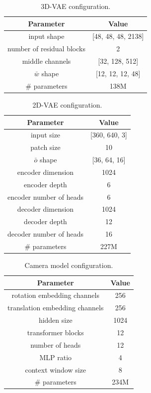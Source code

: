 \documentclass{article}
\theoremstyle{plain}
\theoremstyle{definition}
\theoremstyle{remark}
\begin{document}
\begin{table}[htb!]
\centering
\caption{3D-VAE configuration.}
\begin{tabular}{cc}\toprule  
Parameter & Value \\
\midrule
input shape & [48, 48, 48, 2138] \\
number of residual blocks & 2 \\
middle channels & [32, 128, 512] \\
$\bar{w}$ shape & [12, 12, 12, 48] \\
\# parameters & 138M \\
\bottomrule
\end{tabular}
\label{table:w-vae}
\end{table}

\begin{table}[htb!]
\centering
\caption{2D-VAE configuration.}
\begin{tabular}{cc}\toprule  
Parameter & Value \\
\midrule
input size & [360, 640, 3] \\
patch size & 10 \\
$\bar{o}$ shape & [36, 64, 16] \\
encoder dimension & 1024 \\
encoder depth & 6 \\
encoder number of heads & 6 \\
decoder dimension & 1024 \\
decoder depth & 12 \\
decoder number of heads & 16 \\
\# parameters & 227M \\
\bottomrule
\end{tabular}
\label{table:p-vae}
\end{table}

\begin{table}[htb!]
\centering
\caption{Camera model configuration.}
\begin{tabular}{cc}\toprule  
Parameter & Value \\
\midrule
rotation embedding channels & 256 \\
translation embedding channels & 256 \\
hidden size & 1024 \\
transformer blocks & 12 \\
number of heads & 12 \\
MLP ratio & 4 \\
context window size & 8 \\
\# parameters & 234M \\
\bottomrule
\end{tabular}
\label{table:cam-model}
\end{table}
\end{document}
